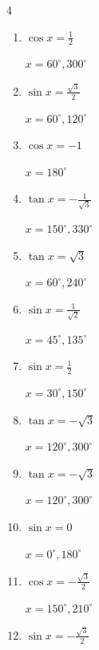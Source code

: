 \begin{multicols}{4}
\begin{enumerate}
        $\displaystyle x = 150^{\circ} , 330^{\circ}$

  \item $\displaystyle \cos{x}  = \frac{1}{2}$

        $\displaystyle x = 60^{\circ} , 300^{\circ}$

  \item $\displaystyle \sin{x}  = \frac{\sqrt{3}}{2}$

        $\displaystyle x = 60^{\circ} , 120^{\circ}$

  \item $\displaystyle \cos{x}  = -1$

        $\displaystyle x = 180^{\circ}$

  \item $\displaystyle \tan{x}  = -\frac{1}{\sqrt{3}}$

        $\displaystyle x = 150^{\circ} , 330^{\circ}$

  \item $\displaystyle \tan{x}  = \sqrt{3}$

        $\displaystyle x = 60^{\circ} , 240^{\circ}$

  \item $\displaystyle \sin{x}  = \frac{1}{\sqrt{2}}$

        $\displaystyle x = 45^{\circ} , 135^{\circ}$

  \item $\displaystyle \sin{x}  = \frac{1}{2}$

        $\displaystyle x = 30^{\circ} , 150^{\circ}$

  \item $\displaystyle \tan{x}  = -\sqrt{3}$

        $\displaystyle x = 120^{\circ} , 300^{\circ}$

  \item $\displaystyle \tan{x}  = -\sqrt{3}$

        $\displaystyle x = 120^{\circ} , 300^{\circ}$

  \item $\displaystyle \sin{x}  = 0$

        $\displaystyle x = 0^{\circ} , 180^{\circ}$

  \item $\displaystyle \cos{x}  = -\frac{\sqrt{3}}{2}$

        $\displaystyle x = 150^{\circ} , 210^{\circ}$

  \item $\displaystyle \sin{x}  = -\frac{\sqrt{3}}{2}$


\end{enumerate}
\end{multicols}
